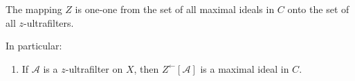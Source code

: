 The mapping $Z$ is one-one from the set of all maximal ideals in $C$ onto the set of all $z$-ultrafilters.

In particular:
\begin{enumerate}
\item[(b)] If $\mathcal{A}$ is a $z$-ultrafilter on $X$, then $Z^{\leftarrow}[\mathcal{A}]$ is a maximal ideal in $C$.
\end{enumerate}
